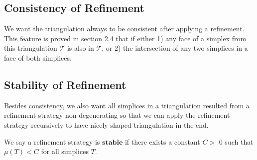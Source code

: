     \subsection{Consistency of Refinement}
    We want the triangulation always to be consistent after applying a refinement. This feature is proved in section 2.4 that if either 1) any face of a simplex from this triangulation $\mathcal{T}$ is also in $\mathcal{T}$, or 2) the intersection of any two simplices in a face of both simplices.

    \subsection{Stability of Refinement}
    Besides consistency, we also want all simplices in a triangulation resulted from a refinement strategy non-degenerating so that we can apply the refinement strategy recursively to have nicely shaped triangulation in the end.
    
    \begin{definition}
    We say a refinement strategy is $\textbf{stable}$ if there exists a constant $C >$ 0 such that $\mu(T)< C$ for all simplices $T$.
    \end{definition}
    
